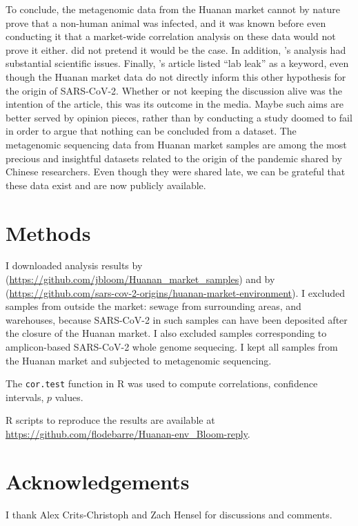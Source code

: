 \documentclass[11pt]{article}
\def \sct {\mbox{SARS-CoV-2}}
\begin{document}
To conclude, the metagenomic data from the Huanan market cannot by nature prove that a non-human animal was infected, and it was known before even conducting it that a market-wide correlation analysis on these data would not prove it either. \citet{ACC2023Zenodo} did not pretend it would be the case. In addition, \citet{Bloom2023VE}'s analysis had substantial scientific issues. Finally, \citet{Bloom2023VE}'s article listed ``lab leak'' as a keyword, even though the Huanan market data do not directly inform this other hypothesis for the origin of \sct{}. Whether or not keeping the discussion alive was the intention of the article, this was its outcome in the media. Maybe such aims are better served by opinion pieces, rather than by conducting a study doomed to fail in order to argue that nothing can be concluded from a dataset. The metagenomic sequencing data from Huanan market samples are among the most precious and insightful datasets related to the origin of the pandemic shared by Chinese researchers. Even though they were shared late, we can be grateful that these data exist and are now publicly available.        

\section{Methods}
I downloaded analysis results by \citet{Bloom2023VE} (\url{https://github.com/jbloom/Huanan_market_samples}) and by \citet{ACC2023bioRxiv} (\url{https://github.com/sars-cov-2-origins/huanan-market-environment}). I excluded samples from outside the market: sewage from surrounding areas, and warehouses, because \sct{} in such samples can have been deposited after the closure of the Huanan market. I also excluded samples corresponding to amplicon-based \sct{} whole genome sequecing. I kept all samples from the Huanan market and subjected to metagenomic sequencing.  

The \texttt{cor.test} function in R was used to compute correlations, confidence intervals, $p$ values.

R scripts to reproduce the results are available at \url{https://github.com/flodebarre/Huanan-env_Bloom-reply}.


\section{Acknowledgements} I thank Alex Crits-Christoph and Zach Hensel for discussions and comments. 



\end{document}
